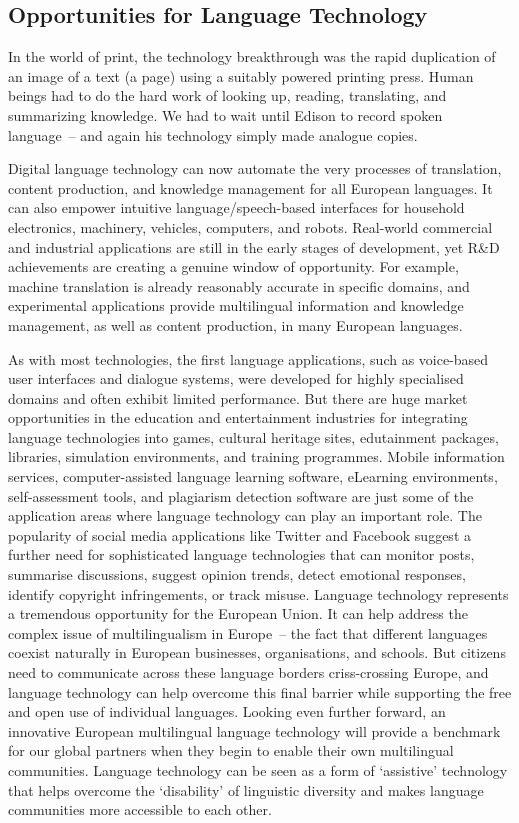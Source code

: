 \begin{multicols}{2}
\subsection{Opportunities for Language Technology}

In the world of print, the technology breakthrough was the rapid duplication of an image of a text (a page) using a suitably powered printing press. 
Human beings had to do the hard work of looking up, reading, translating, and summarizing knowledge. 
We had to wait until Edison to record spoken language~-- and again his technology simply made analogue copies.

Digital language technology can now automate the very processes of translation, content production, and knowledge management for all European languages. 
It can also empower intuitive language/speech-based interfaces for household electronics, machinery, vehicles, computers, and robots. 
Real-world commercial and industrial applications are still in the early stages of development, yet R\&D achievements are creating a genuine window of opportunity. 
For example, machine translation is already reasonably accurate in specific domains, and experimental applications provide multilingual information and knowledge management, as well as content production, in many European languages. 

As with most technologies, the first language applications, such as voice-based user interfaces and dialogue systems, were developed for highly specialised domains and often exhibit limited performance. 
But there are huge market opportunities in the education and entertainment industries for integrating language technologies into games, cultural heritage sites, edutainment packages, libraries, simulation environments, and training programmes. 
Mobile information services, computer-assisted language learning software, eLearning environments, self-assessment tools, and plagiarism detection software are just some of the application areas where language technology can play an important role. 
The popularity of social media applications like Twitter and Facebook suggest a further need for sophisticated language technologies that can monitor posts, summarise discussions, suggest opinion trends, detect emotional responses, identify copyright infringements, or track misuse.
Language technology represents a tremendous opportunity for the European Union. 
It can help address the complex issue of multilingualism in Europe~-- the fact that different languages coexist naturally in European businesses, organisations, and schools. 
But citizens need to communicate across these language borders criss-crossing Europe, and language technology can help overcome this final barrier while supporting the free and open use of individual languages.
Looking even further forward, an innovative European multilingual language technology will provide a benchmark for our global partners when they begin to enable their own multilingual communities.
Language technology can be seen as a form of `assistive' technology that helps overcome the `disability' of linguistic diversity and makes language communities more accessible to each other.


\end{multicols}
